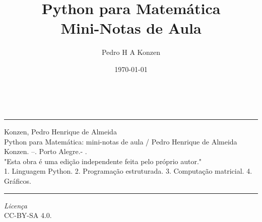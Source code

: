 \documentclass[a4paper,10pt,twoside]{article}
\begin{document}
\title{Python para Matemática\\{\small Mini-Notas de Aula}}
\author{Pedro H A Konzen}
\date{\today}

\maketitle

\ifisbook
~
\vspace{3.5in}
\hrule
Konzen, Pedro Henrique de Almeida\\
\indent\hspace{2em}Python para Matemática: mini-notas de aula / Pedro Henrique de Almeida Konzen. --{\the\year}. Porto Alegre.- {\the\year}.\\
\indent\hspace{2em}"Esta obra é uma edição independente feita pelo próprio autor."\\
\indent\hspace{2em}1. Linguagem Python. 2. Programação estruturada. 3. Computação matricial. 4. Gráficos.\\
\hrule
\vspace{1cm}
\begin{center}
  \textit{Licença}\\CC-BY-SA 4.0.
\end{center}
\fi

\newpage
\tableofcontents












{}
\theendnotes

\newpage


  
\newpage

\printindex
\end{document}
